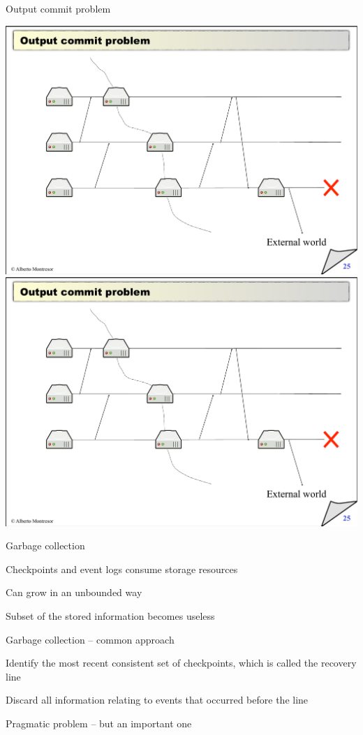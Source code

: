 \begin{frame}{Output commit problem}

\begin{overprint}
\includegraphics[width=\textwidth,page=1]{output-commit}
\includegraphics[width=\textwidth,page=2]{output-commit}
\end{overprint}

\end{frame}

\begin{frame}{Garbage collection}
\BI
\item Checkpoints and event logs consume storage resources
\BI
\item Can grow in an unbounded way
\item Subset of the stored information becomes useless
\EI
\item Garbage collection – common approach
\BI
\item Identify the most recent consistent set of checkpoints, which is called the recovery line
\item Discard all information relating to events that occurred before the line
\EI
\item Pragmatic problem – but an important one
\EI
\end{frame}

